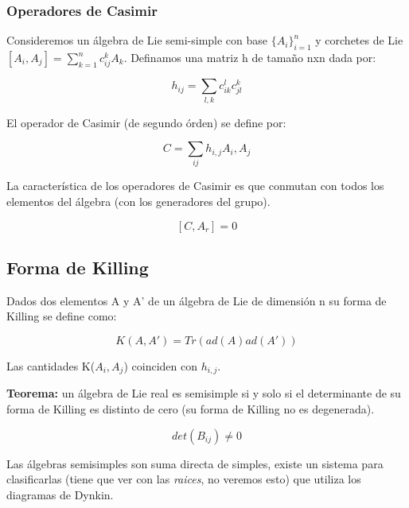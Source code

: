 \subsubsection{Operadores de Casimir}

Consideremos un álgebra de Lie semi-simple con base $\lbrace A_i \rbrace _{i=1}^n$ y corchetes de Lie $[A_i,A_j]=\sum _{k=1}^n c_{ij}^k A_k$. Definamos una matriz h de tamaño nxn dada por:

$$h_{ij}=\sum _{l,k}c^l_{ik}c^k_{jl}$$

El operador de Casimir (de segundo órden) se define por:

$$C=\sum _{ij}h_{i,j}A_i,A_j$$

La característica de los operadores de Casimir es que conmutan con todos los elementos del álgebra (con los generadores del grupo).

$$[C,A_r]=0$$

\subsection{Forma de Killing}

Dados dos elementos A y A' de un álgebra de Lie de dimensión n su forma de Killing se define como:

$$K(A,A')=Tr(ad(A)ad(A'))$$

Las cantidades K($A_i,A_j$) coinciden con $h_{i,j}$.

\textbf{Teorema:} un álgebra de Lie real es semisimple si y solo si el determinante de su forma de Killing es distinto de cero (su forma de Killing no es degenerada).

$$det(B_{ij})\neq 0$$

Las álgebras semisimples son suma directa de simples, existe un sistema para clasificarlas (tiene que ver con las \textit{raices}, no veremos esto) que utiliza los diagramas de Dynkin.

\newpage
